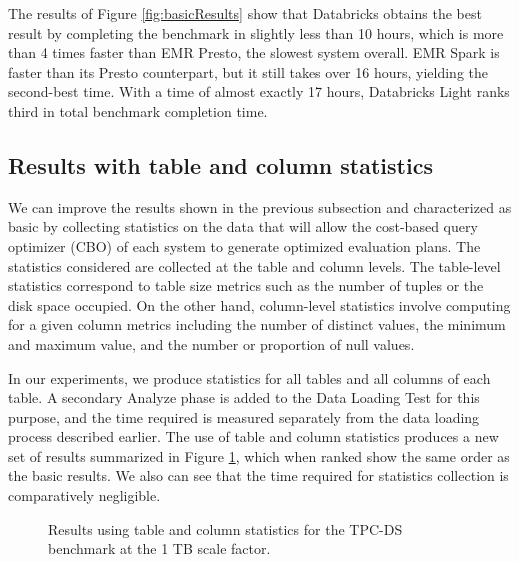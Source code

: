 The results of Figure \ref{fig:basicResults} show that Databricks obtains the best result by completing the benchmark in slightly less than 10 hours, which is more than 4 times faster than EMR Presto, the slowest system overall. EMR Spark is faster than its Presto counterpart, but it still takes over 16 hours, yielding the second-best time. With a time of almost exactly 17 hours, Databricks Light ranks third in total benchmark completion time.

\subsection{Results with table and column statistics}\label{statsResults}

We can improve the results shown in the previous subsection and characterized as basic by collecting statistics on the data that will allow the cost-based query optimizer (CBO) of each system to generate optimized evaluation plans. The statistics considered are collected at the table and column levels. The table-level statistics correspond to table size metrics such as the number of tuples or the disk space occupied. On the other hand, column-level statistics involve computing for a given column metrics including the number of distinct values, the minimum and maximum value, and the number or proportion of null values.

In our experiments, we produce statistics for all tables and all columns of each table. A secondary Analyze phase is added to the Data Loading Test for this purpose, and the time required is measured separately from the data loading process described earlier. The use of table and column statistics produces a new set of results summarized in Figure \ref{fig:statsResults}, which when ranked show the same order as the basic results. We also can see that the time required for statistics collection is comparatively negligible. 

\begin{figure}
   \begin{center}
   \end{center}
   \caption{Results using table and column statistics for the TPC-DS benchmark at the 1 TB scale factor.}
   \label{fig:statsResults}
\end{figure}

